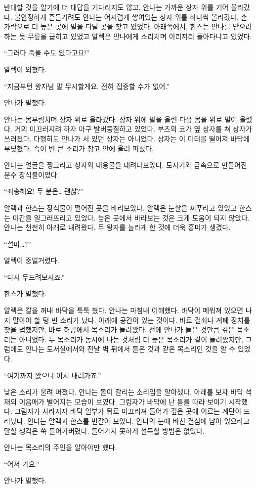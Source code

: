 반대할 것을 알기에 더 대답을 기다리지도 않고, 안나는 가까운 상자 위를 기어 올라갔다. 불안정하게 흔들거려도 안나는 어지럽게 쌓여있는 상자 위를 하나씩 올라갔다. 손가락으로 더 높은 곳에 발을 디딜 곳을 찾고 있었다. 아래쪽에서, 한스는 안나를 받으려 하는 듯 무릎을 굽히고 있었고 알렉은 안나에게 소리치며 이리저리 돌아다니고 있었다.

``그러다 죽을 수도 있다고요!''

알렉이 외쳤다.

``지금부턴 왕자님 말 무시할게요. 전혀 집중할 수가 없어.''

안나가 말했다.

안나는 몸부림치며 상자 위로 올라갔다. 상자 위에 팔을 올린 다음 몸을 위로 밀어 올렸다. 거의 미끄러지려 하자 마구 발버둥질하고 있었다. 부츠의 코가 옆 상자를 쳐 상자가 쓰러졌다. 다행히도 안나가 서 있던 상자는 아니었다. 상자는 이 미터를 떨어져 바닥에 부딪혔다. 속이 빈 큰 소리가 창고 안에 울려 퍼졌다.

안나는 얼굴을 찡그리고 상자의 내용물을 내려다보았다. 도자기와 금속으로 만들어진 분수 장식물이었다.

``죄송해요! 두 분은\ldots\,괜찮?''

알렉과 한스는 장식물이 떨어진 곳을 바라보았다. 알렉은 눈살을 찌푸리고 있었고 한스는 미간을 일그러뜨리고 있었다. 높은 곳에서 바라보는 것은 크게 도움이 되지 않았다. 안나는 천천히 아래로 내려왔다. 두 왕자를 놀라게 한 것에 더욱 흥미가 생겼다.

``설마\ldots?''

알렉이 중얼거렸다.

``다시 두드려보시죠.''

한스가 말했다.

알렉은 칼을 꺼내 바닥을 툭툭 쳤다. 안나는 마침내 이해했다. 바닥이 메워져 있으면 나지 말아야 할 텅 빈 소리가 났다. 아래에 공간이 있는 것이다. 바로 걸쇠나 계폐 장치를 찾을 법했지만, 바로 허공에서 목소리가 들려왔다. 전에 안나가 들은 것만큼 깊은 목소리는 아니었다. 두 목소리가 동시에 나는 것처럼 더 높은 목소리가 같이 들려왔지만, 그럼에도 안나는 도서실에서와 전날 벽 뒤에서 들은 것과 같은 목소리인 것을 알 수 있었다.

``여기까지 왔으니 어서 내려가죠.''

낮은 소리가 울려 퍼졌다. 안나는 돌이 갈리는 소리임을 알아챘다. 아래를 보자 바닥 석재의 이음매가 벌어지는 모습이 보였다. 그림자가 바닥에 난 틈을 따라 보이기 시작했다. 그림자가 사라지자 바닥 일부가 뒤로 미끄러져 들어가 깊은 곳에 이르는 계단이 드러났다. 안나는 알렉과 한스를 번갈아 보았다. 안나의 눈에 비친 결심에 남아 있으라고 말할 생각은 쑥 들어가버렸다. 들어가지 못하게 설득할 방법은 없었다.

안나는 목소리의 주인을 알아야만 했다.

``어서 가요.''

안나가 말했다.

